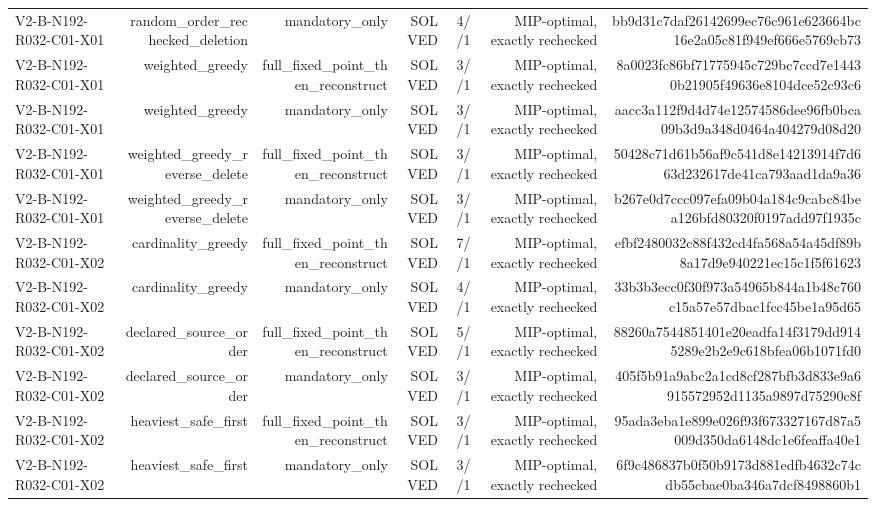 {\begin{longtable}{lrrrrrr}
V2-B-N192-R032-C01-X01 & random\_order\_rechecked\_deletion & mandatory\_only & SOLVED & 4//1 & MIP-optimal, exactly rechecked & bb9d31c7daf26142699ec76c961e623664bc16e2a05c81f949ef666e5769cb73 \\
V2-B-N192-R032-C01-X01 & weighted\_greedy & full\_fixed\_point\_then\_reconstruct & SOLVED & 3//1 & MIP-optimal, exactly rechecked & 8a0023fc86bf71775945c729bc7ccd7e14430b21905f49636e8104dce52c93c6 \\
V2-B-N192-R032-C01-X01 & weighted\_greedy & mandatory\_only & SOLVED & 3//1 & MIP-optimal, exactly rechecked & aacc3a112f9d4d74e12574586dee96fb0bca09b3d9a348d0464a404279d08d20 \\
V2-B-N192-R032-C01-X01 & weighted\_greedy\_reverse\_delete & full\_fixed\_point\_then\_reconstruct & SOLVED & 3//1 & MIP-optimal, exactly rechecked & 50428c71d61b56af9c541d8e14213914f7d663d232617de41ca793aad1da9a36 \\
V2-B-N192-R032-C01-X01 & weighted\_greedy\_reverse\_delete & mandatory\_only & SOLVED & 3//1 & MIP-optimal, exactly rechecked & b267e0d7ccc097efa09b04a184c9cabc84bea126bfd80320f0197add97f1935c \\
V2-B-N192-R032-C01-X02 & cardinality\_greedy & full\_fixed\_point\_then\_reconstruct & SOLVED & 7//1 & MIP-optimal, exactly rechecked & efbf2480032c88f432cd4fa568a54a45df89b8a17d9e940221ec15c1f5f61623 \\
V2-B-N192-R032-C01-X02 & cardinality\_greedy & mandatory\_only & SOLVED & 4//1 & MIP-optimal, exactly rechecked & 33b3b3ecc0f30f973a54965b844a1b48c760c15a57e57dbac1fcc45be1a95d65 \\
V2-B-N192-R032-C01-X02 & declared\_source\_order & full\_fixed\_point\_then\_reconstruct & SOLVED & 5//1 & MIP-optimal, exactly rechecked & 88260a7544851401e20eadfa14f3179dd9145289e2b2e9c618bfea06b1071fd0 \\
V2-B-N192-R032-C01-X02 & declared\_source\_order & mandatory\_only & SOLVED & 3//1 & MIP-optimal, exactly rechecked & 405f5b91a9abc2a1cd8cf287bfb3d833e9a6915572952d1135a9897d75290c8f \\
V2-B-N192-R032-C01-X02 & heaviest\_safe\_first & full\_fixed\_point\_then\_reconstruct & SOLVED & 3//1 & MIP-optimal, exactly rechecked & 95ada3eba1e899e026f93f673327167d87a5009d350da6148dc1e6feaffa40e1 \\
V2-B-N192-R032-C01-X02 & heaviest\_safe\_first & mandatory\_only & SOLVED & 3//1 & MIP-optimal, exactly rechecked & 6f9c486837b0f50b9173d881edfb4632c74cdb55cbae0ba346a7dcf8498860b1 \\

\end{longtable}}
